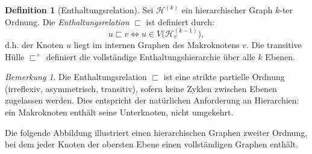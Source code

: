 ﻿\documentclass[12pt,a4paper,twoside]{article}
\theoremstyle{definition}
\newtheorem{definition}{Definition}[section]
\theoremstyle{plain}
\theoremstyle{remark}
\newtheorem{bemerkung}{Bemerkung}[section]
\begin{document}
\begin{definition}[Enthaltungsrelation]
	\label{def:enthalten}
	Sei $\mathcal{H}^{(k)}$ ein hierarchischer Graph $k$-ter Ordnung.
	Die \emph{Enthaltungsrelation} $\sqsubset$ ist definiert durch:
	\[
	u \sqsubset v \iff u \in V\!\bigl(\mathcal{H}^{(k-1)}_v\bigr),
	\]
	d.h. der Knoten $u$ liegt im internen Graphen des Makroknotens $v$.
	Die transitive Hülle $\sqsubset^{+}$ definiert die vollständige
	Enthaltungshierarchie über alle $k$ Ebenen.
\end{definition}

\begin{bemerkung}
	Die Enthaltungsrelation $\sqsubset$ ist eine strikte partielle Ordnung
	(irreflexiv, asymmetrisch, transitiv), sofern keine Zyklen zwischen
	Ebenen zugelassen werden.  Dies entspricht der natürlichen Anforderung
	an Hierarchien: ein Makroknoten enthält seine Unterknoten, nicht
	umgekehrt.
\end{bemerkung}

Die folgende Abbildung illustriert einen hierarchischen Graphen zweiter
Ordnung, bei dem jeder Knoten der obersten Ebene einen vollständigen
Graphen enthält.
\end{document}
